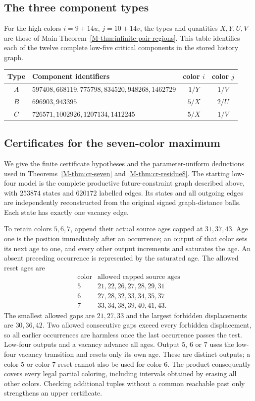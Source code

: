 \documentclass[11pt,reqno]{amsart}
\theoremstyle{plain}
\theoremstyle{plain}
\theoremstyle{plain}
\begin{document}
\subsection{The three component types}\label{S-supp:component-types}
For the high colors $i=9+14u$, $j=10+14v$, the types and quantities
$X,Y,U,V$ are those of Main Theorem~\ref*{M-thm:infinite-pair-regions}.
This table identifies each of the twelve complete low-five critical
components in the stored history graph.
\begin{center}\small
\begin{tabular}{clcc}
\toprule
Type & Component identifiers & color $i$ & color $j$\\
\midrule
$A$ & $597408,668119,775798,834520,948268,1462729$
    & $1/Y$ & $1/V$\\
$B$ & $696903,943395$ & $5/X$ & $2/U$\\
$C$ & $726571,1002926,1207134,1412245$ & $5/X$ & $1/V$\\
\bottomrule
\end{tabular}
\end{center}

\subsection{Certificates for the seven-color maximum}
\label{S-supp:cr-certificates}

We give the finite certificate hypotheses and the parameter-uniform
deductions used in Theorems~\ref*{M-thm:cr-seven} and
\ref*{M-thm:cr-residue8}. The starting low-four model is the complete
productive future-constraint graph described above, with $253874$
states and $620172$ labelled edges. Its states and all outgoing edges
are independently reconstructed from the original signed graph-distance
balls. Each state has exactly one vacancy edge.

To retain colors $5,6,7$, append their actual source ages capped at
$31,37,43$. Age one is the position immediately after an occurrence;
an output of that color sets its next age to one, and every other
output increments and saturates the age. An absent preceding occurrence
is represented by the saturated age. The allowed reset ages are
\[
 \begin{array}{c|l}
 \text{color}&\text{allowed capped source ages}\\\hline
 5&21,22,26,27,28,29,31\\
 6&27,28,32,33,34,35,37\\
 7&33,34,38,39,40,41,43.
 \end{array}
\]
The smallest allowed gaps are $21,27,33$ and the largest forbidden
displacements are $30,36,42$. Two allowed consecutive gaps exceed
every forbidden displacement, so all earlier occurrences are harmless
once the last occurrence passes the test. Low-four outputs and a
vacancy advance all ages. Output $5$, $6$ or $7$ uses the low-four
vacancy transition and resets only its own age. These are distinct
outputs; a color-$5$ or color-$7$ reset cannot also be used for color
$6$. The product consequently covers every legal partial coloring,
including intervals obtained by erasing all other colors. Checking
additional tuples without a common reachable past only strengthens
an upper certificate.
\end{document}
